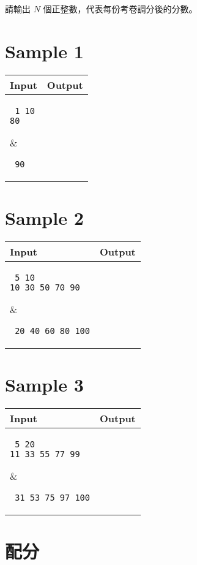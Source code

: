 \documentclass[11pt,a4paper]{article}
\begin{document}
請輸出 $N$ 個正整數，代表每份考卷調分後的分數。

\newpage
\section*{Sample 1}
\begin{longtable}[!h]{|p{}|p{}|}
\hline
\textbf {Input}	& \textbf {Output} \\
\hline
\parbox[t]{0.5\textwidth} %
{ \tt
1 10\\
80\\
} &
\parbox[t]{0.5\textwidth}
{ \tt
90\\
} \\
\hline
\end{longtable}

\section*{Sample 2}
\begin{longtable}[!h]{|p{}|p{}|}
\hline
\textbf {Input}	& \textbf {Output} \\
\hline
\parbox[t]{0.5\textwidth} %
{ \tt
5 10\\
10 30 50 70 90\\
} &
\parbox[t]{0.5\textwidth}
{ \tt
20 40 60 80 100\\
} \\
\hline
\end{longtable}

\section*{Sample 3}
\begin{longtable}[!h]{|p{}|p{}|}
\hline
\textbf {Input}	& \textbf {Output} \\
\hline
\parbox[t]{0.5\textwidth} %
{ \tt
5 20\\
11 33 55 77 99\\
} &
\parbox[t]{0.5\textwidth}
{ \tt
31 53 75 97 100\\
} \\
\hline
\end{longtable}

\section*{配分}
\end{document}
